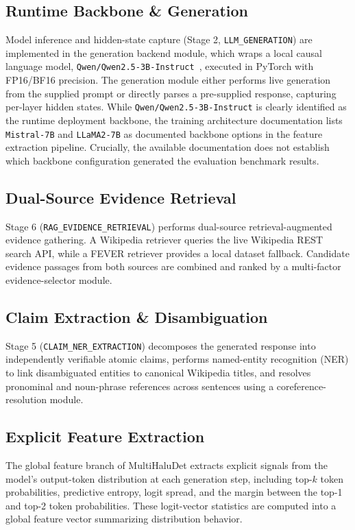 \documentclass[conference]{IEEEtran}
\begin{document}
\subsection{Runtime Backbone \& Generation}
Model inference and hidden-state capture (Stage 2, \texttt{LLM\_GENERATION}) are implemented in the generation backend module, which wraps a local causal language model, \texttt{Qwen/Qwen2.5-3B-Instruct}~\cite{qwen2024technical}, executed in PyTorch with FP16/BF16 precision. The generation module either performs live generation from the supplied prompt or directly parses a pre-supplied response, capturing per-layer hidden states. While \texttt{Qwen/Qwen2.5-3B-Instruct} is clearly identified as the runtime deployment backbone, the training architecture documentation lists \texttt{Mistral-7B} and \texttt{LLaMA2-7B} as documented backbone options in the feature extraction pipeline. Crucially, the available documentation does not establish which backbone configuration generated the evaluation benchmark results.

\subsection{Dual-Source Evidence Retrieval}
Stage 6 (\texttt{RAG\_EVIDENCE\_RETRIEVAL}) performs dual-source retrieval-augmented evidence gathering. A Wikipedia retriever queries the live Wikipedia REST search API, while a FEVER retriever provides a local dataset fallback. Candidate evidence passages from both sources are combined and ranked by a multi-factor evidence-selector module.

\subsection{Claim Extraction \& Disambiguation}
Stage 5 (\texttt{CLAIM\_NER\_EXTRACTION}) decomposes the generated response into independently verifiable atomic claims, performs named-entity recognition (NER) to link disambiguated entities to canonical Wikipedia titles, and resolves pronominal and noun-phrase references across sentences using a coreference-resolution module.

\subsection{Explicit Feature Extraction}
The global feature branch of MultiHaluDet extracts explicit signals from the model’s output-token distribution at each generation step, including top-$k$ token probabilities, predictive entropy, logit spread, and the margin between the top-1 and top-2 token probabilities. These logit-vector statistics are computed into a global feature vector summarizing distribution behavior.
\end{document}

